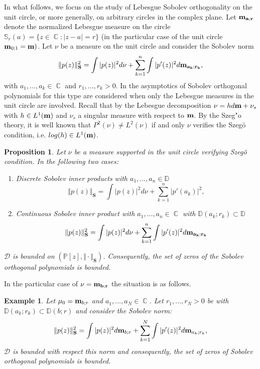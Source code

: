 \documentclass[12pt]{amsart}
\theoremstyle{definition}
\theoremstyle{plain}
\newtheorem{prop}{Proposition}
\newtheorem{ejem}{Example}
\theoremstyle{remark}
\DeclareMathOperator{\CC}{\mathbb C}
\begin{document}
\noindent In what follows, we focus on the study of Lebesgue Sobolev orthogonality on the unit circle, or more generally, on arbitrary circles in the complex plane.  Let ${\bf m_{a;r}}$ denote the normalized Lebesgue measure on the circle $\mathbb{S}_{r}(a)=\{z\in \CC: \vert z-a \vert =r\}$ (in the particular case of the unit circle ${\bf m}_{0;1}={\bf m})$. Let $\nu$ be a measure on the unit circle and consider  the  Sobolev norm
$$
\Vert p(z) \Vert^{2}_{\mathbf{S}}= \int \vert p(z) \vert^{2} d \nu + 
 \sum_{k=1}^{n} \int \vert p'(z) \vert^{2} d{\bf m_{a_k;r_k}},
$$
\noindent with $a_1,\dots,a_k\in \CC$ and $r_1,\dots,r_k>0$. In \cite{Cachafeiro} the asymptotics of Sobolev orthogonal polynomials for this type are considered when only the Lebesgue measures in the unit circle are involved. Recall that by the Lebesgue decomposition $\nu=hd{\bf m}+\nu_s$ with $h\in L^{1}({\bf m})$ and $\nu_s$ a singular measure with respect to ${\bf m}$. By the Szeg"{o} theory, it is well known that $P^{2}(\nu)\neq L^{2}(\nu)$ if and only $\nu$ verifies the Szeg\"{o} condition, i.e. $log(h)\in L^{1}({\bf m})$. 

\begin{prop} Let $\nu$ be a measure supported in  the unit circle verifying Szeg\"{o} condition. In the following two cases:
\begin{enumerate} 
\item Discrete Sobolev inner products with $a_1,\dots,a_n\in \mathbb{D}$ 
$$
\Vert p(z) \Vert_{\mathbf{S}} = \int \vert p(z) \vert^{2} d\nu + \sum_{k=1}^{n} \vert p'(a_k) \vert^{2},
$$
\item Continuous Sobolev inner product with $a_1,\dots,a_n\in \CC$ with $\mathbb{D}(a_k;r_k) \subset \mathbb{D}$
$$
\Vert p(z) \Vert^{2}_{\mathbf{S}}= \int \vert p(z) \vert^{2} d \nu + 
 \sum_{k=1}^{n} \int \vert p'(z) \vert^{2} d{\bf m_{a_k;r_k}}
$$
\end{enumerate}
\noindent $\mathcal{D}$ is bounded on $(\mathbb{P}[z], \Vert \cdot \Vert_{\mathbf{S}})$. Consequently, the set of zeros of the Sobolev orthogonal polynomials is bounded. 
\end{prop}


\noindent In the particular case of $\nu={\bf m_{b;r}}$ the situation is as follows. 
\begin{ejem} Let $\mu_0={\bf m}_{b;r}$ 
 and $a_1,\dots,a_N\in \CC$.  Let  $r_1,\dots,r_N>0$ be with $\mathbb{D}(a_k;r_k) \subset \mathbb{D}(b;r)$ and consider the Sobolev norm:  
 $$
 \Vert p(z) \Vert^{2}_{\mathbf{S}} = \int \vert p(z) \vert^{2} d{\bf m}_{b;r}+ \sum_{k=1}^{N} \int \vert p'(z) \vert^{2} d{\bf m}_{a_k;r_k},
 $$
 \noindent $\mathcal{D}$ is bounded with respect this norm and consequently, the 
  set of zeros of Sobolev orthogonal polynomials is bounded. 
 
\end{ejem}
\end{document}
